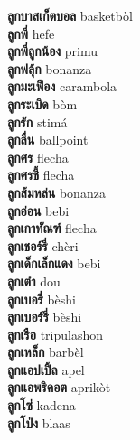 \textbf{ ลูกบาสเก็ตบอล  } basketbòl \\
\textbf{ ลูกพี่  } hefe \\
\textbf{ ลูกพี่ลูกน้อง  } primu \\
\textbf{ ลูกฟลุ้ก  } bonanza \\
\textbf{ ลูกมะเฟือง  } carambola \\
\textbf{ ลูกระเบิด  } bòm \\
\textbf{ ลูกรัก  } stimá \\
\textbf{ ลูกลื่น  } ballpoint \\
\textbf{ ลูกศร  } flecha \\
\textbf{ ลูกศรชี้  } flecha \\
\textbf{ ลูกส้มหล่น  } bonanza \\
\textbf{ ลูกอ่อน  } bebi \\
\textbf{ ลูกเกาทัณฑ์  } flecha \\
\textbf{ ลูกเชอร์รี่  } chèri \\
\textbf{ ลูกเด็กเล็กแดง  } bebi \\
\textbf{ ลูกเต๋า  } dou \\
\textbf{ ลูกเบอรี่  } bèshi \\
\textbf{ ลูกเบอร์รี่  } bèshi \\
\textbf{ ลูกเรือ  } tripulashon \\
\textbf{ ลูกเหล็ก  } barbèl \\
\textbf{ ลูกแอปเปิ้ล  } apel \\
\textbf{ ลูกแอพริคอต  } aprikòt \\
\textbf{ ลูกโซ่  } kadena \\
\textbf{ ลูกโป่ง  } blaas \\
